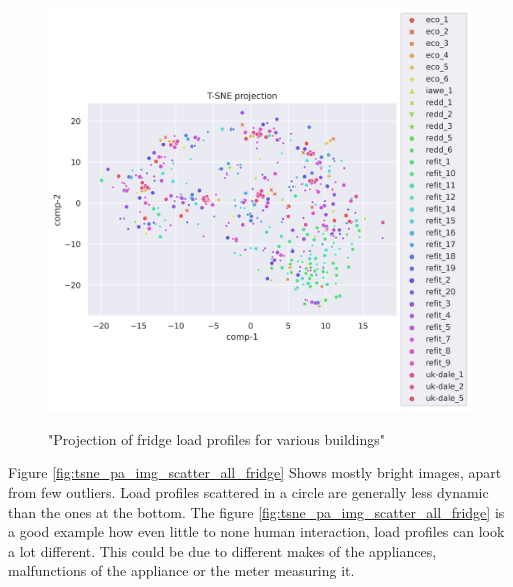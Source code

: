 \begin{figure}[H]
	\centering
	\caption{"Projection of fridge load profiles for various buildings"}
	\includegraphics[width=1.2\textwidth]{Figures/TSNE/TSNE_per_appliance/all/scatter_all_fridge_freeezer_fridge freezer.png}
	\label{fig:tsne_pa_scatter_all_fridge}
\end{figure}

Figure \ref{fig:tsne_pa_img_scatter_all_fridge} Shows mostly bright images, apart from few outliers.
Load profiles scattered in a circle are generally less dynamic than the ones at the bottom.
The figure \ref{fig:tsne_pa_img_scatter_all_fridge} is a good example how even little to none human
interaction, load profiles can look a lot different. 
This could be due to different makes of the appliances, malfunctions of the appliance or the meter measuring it.

